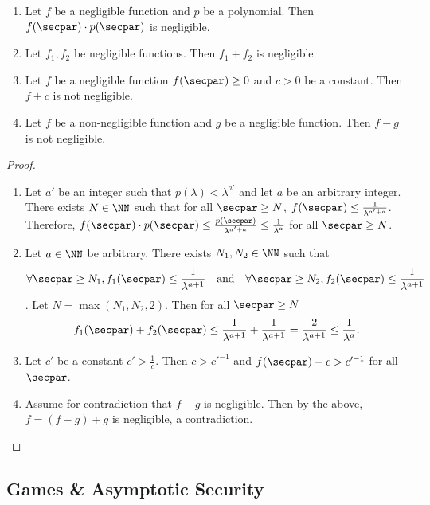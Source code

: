 \begin{proposition}
  \label{lem:negl}
  \hfill
  \begin{enumerate}
  \item Let $f$ be a negligible function and $p$ be a polynomial. Then $f(\secpar) \cdot p(\secpar)$ is negligible.
  \item Let $f_1, f_2$ be negligible functions. Then $f_1 + f_2$ is negligible.
  \item Let $f$ be a negligible function $f(\secpar) \ge 0$ and $c > 0$ be a constant. Then $f + c$ is not negligible.
  \item Let $f$ be a non-negligible function and $g$ be a negligible function. Then $f - g$ is not negligible.
  \end{enumerate}
\end{proposition}
\begin{proof}
  \hfill
  \begin{enumerate}
  \item Let $a'$ be an integer such that $p(\lambda) < \lambda^{a'}$ and let $a$ be an arbitrary integer.
    There exists $N \in \NN$ such that for all $\secpar \ge N$, $f(\secpar) \le \frac{1}{\lambda^{a' + a}}$.
    Therefore, $f(\secpar) \cdot p(\secpar) \le \frac{p(\secpar)}{\lambda^{a' + a}} \le \frac{1}{\lambda^{a}}$ for all $\secpar \ge N$.
  \item Let $a \in \NN$ be arbitrary.
    There exists $N_1, N_2 \in \NN$ such that
    \[
    \forall \secpar \ge N_1, f_1(\secpar) \le \frac{1}{\lambda^{a+1}} \quad \text{and} \quad \forall \secpar \ge N_2, f_2(\secpar) \le \frac{1}{\lambda^{a+1}}
    \].
    Let $N = \max(N_1, N_2, 2)$. Then for all $\secpar \ge N$
    \[
      f_1(\secpar) + f_2(\secpar) \le \frac{1}{\lambda^{a+1}} + \frac{1}{\lambda^{a+1}} = \frac{2}{\lambda^{a+1}} \le \frac{1}{\lambda^{a}}.
    \]
  \item Let $c'$ be a constant $c' > \frac{1}{c}$.
    Then $c > c'^{-1}$ and $f(\secpar) + c > c'^{-1}$ for all $\secpar$.
  \item Assume for contradiction that $f - g$ is negligible.
    Then by the above, $f = (f - g) + g$ is negligible, a contradiction.
  \end{enumerate}
\end{proof}

\subsection{Games \& Asymptotic Security}

